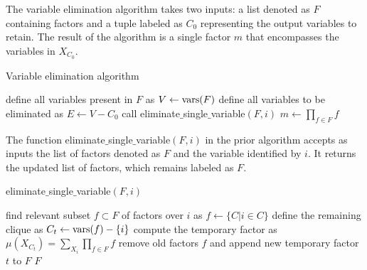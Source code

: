 The variable elimination algorithm takes two inputs: a list denoted as $F$ containing factors and a tuple labeled as $C_0$ representing the output variables to retain. 
The result of the algorithm is a single factor $m$ that encompasses the variables in $X_{C_0}$.
\begin{algorithm}[H]
    \caption{Variable elimination algorithm}
        \begin{algorithmic}[1]
            \State define all variables present in $F$ as $V\leftarrow\textnormal{vars}(F)$
            \State define all variables to be eliminated as $E\leftarrow V-C_0$
                \State call eliminate$\_$single$\_$variable$(F,i)$
            \EndFor
                \State $m \leftarrow \prod_{f \in F}f$
            \EndFor
        \end{algorithmic}
\end{algorithm}
The function eliminate$\_$single$\_$variable$(F,i)$ in the prior algorithm accepts as inputs the list of factors denoted as $F$ and the variable identified by $i$. 
It returns the updated list of factors, which remains labeled as $F$.
\begin{algorithm}[H]
    \caption{eliminate$\_$single$\_$variable$(F,i)$}
        \begin{algorithmic}[1]
            \State find relevant subset $f \subset F$ of factors over $i$ as $f \leftarrow\{C|i\in C\}$
            \State define the remaining clique as $C_t \leftarrow \textnormal{vars}(f)-\{i\}$
            \State compute the temporary factor as $\mu(X_{C_t})=\sum_{X_i}\prod_{f \in F}f$
            \State remove old factors $f$ and append new temporary factor $t$ to $F$
            \State \Return $F$
        \end{algorithmic}
\end{algorithm}
